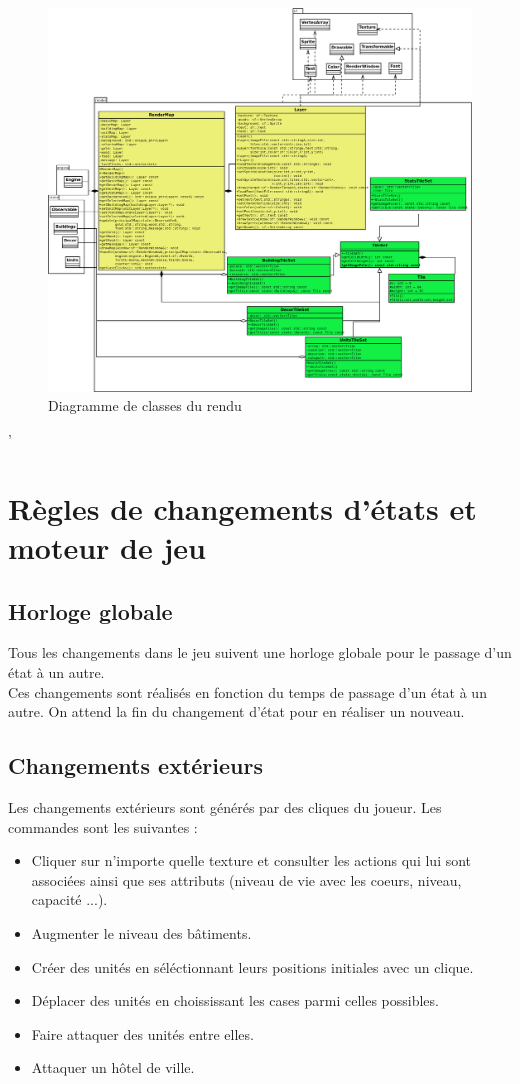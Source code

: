 \documentclass[12pt,a4paper]{article}
\begin{document}
\begin{figure}[!ht]
\centering
    \includegraphics[width=1\textwidth]{ressources/render.png}
     \caption{Diagramme de classes du rendu}
\end{figure}

\newpage
'
\newpage

\section{Règles de changements d'états et moteur de jeu}

\subsection{Horloge globale}
Tous les changements dans le jeu suivent une horloge globale pour le passage d'un état à un autre. \\
Ces changements sont réalisés en fonction du temps de passage d'un état à un autre. On attend la fin du changement d'état pour en réaliser un nouveau.

\subsection{Changements extérieurs}
Les changements extérieurs sont générés par des cliques du joueur. Les commandes sont les suivantes : 
\begin{itemize}
\item Cliquer sur n'importe quelle texture et consulter les actions qui lui sont associées ainsi que ses attributs (niveau de vie avec les coeurs, niveau, capacité ...).
\item Augmenter le niveau des bâtiments.
\item Créer des unités en séléctionnant leurs positions initiales avec un clique.
\item Déplacer des unités en choississant les cases parmi celles possibles.
\item Faire attaquer des unités entre elles.
\item Attaquer un hôtel de ville.
\end{itemize}
\end{document}

